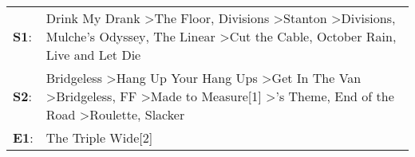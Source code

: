 \begin{supertabular}{p{0.03\textwidth}p{0.92\textwidth}}
 \textbf{S1}:  &                          Drink My Drank\textsuperscript{} \textgreater \enspace The Floor\textsuperscript{}, \enspace Divisions\textsuperscript{} \textgreater \enspace Stanton\textsuperscript{} \textgreater \enspace Divisions\textsuperscript{}, \enspace Mulche's Odyssey\textsuperscript{}, \enspace The Linear\textsuperscript{} \textgreater \enspace Cut the Cable\textsuperscript{}, \enspace October Rain\textsuperscript{}, \enspace Live and Let Die\textsuperscript{}  \enspace  \\
 \textbf{S2}:  &  Bridgeless\textsuperscript{} \textgreater \enspace Hang Up Your Hang Ups\textsuperscript{} \textgreater \enspace Get In The Van\textsuperscript{} \textgreater \enspace Bridgeless\textsuperscript{}, \enspace FF\textsuperscript{} \textgreater \enspace Made to Measure[1]\textsuperscript{} \textgreater {}'s Theme\textsuperscript{}, \enspace End of the Road\textsuperscript{} \textgreater \enspace Roulette\textsuperscript{}, \enspace Slacker\textsuperscript{}  \enspace  \\
 \textbf{E1}:  &                                                                                                                                                                                                                                                                                                                                                                                                                                                The Triple Wide[2]\textsuperscript{}  \enspace  \\
\end{supertabular}
